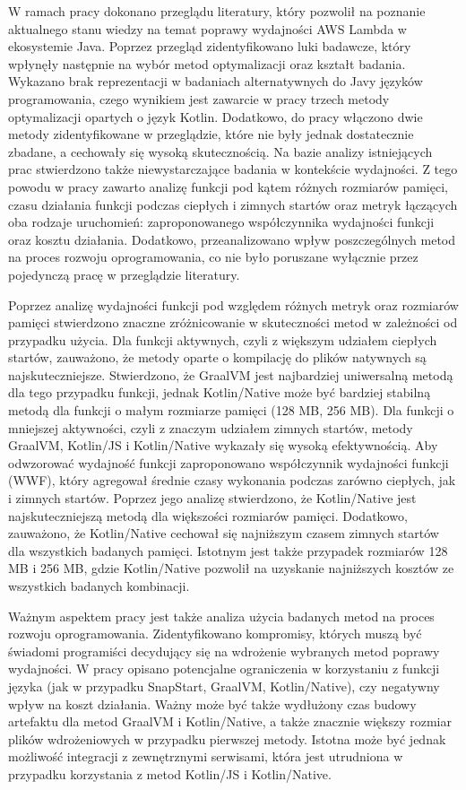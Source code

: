 W ramach pracy dokonano przeglądu literatury, który pozwolił na poznanie aktualnego stanu wiedzy na temat poprawy wydajności AWS Lambda w ekosystemie Java.
Poprzez przegląd zidentyfikowano luki badawcze, który wpłynęły następnie na wybór metod optymalizacji oraz kształt badania.
Wykazano brak reprezentacji w badaniach alternatywnych do Javy języków programowania, czego wynikiem jest zawarcie w pracy trzech metody optymalizacji opartych o język Kotlin.
Dodatkowo, do pracy włączono dwie metody zidentyfikowane w przeglądzie, które nie były jednak dostatecznie zbadane, a cechowały się wysoką skutecznością.
Na bazie analizy istniejących prac stwierdzono także niewystarczające badania w kontekście wydajności.
Z tego powodu w pracy zawarto analizę funkcji pod kątem różnych rozmiarów pamięci, czasu działania funkcji podczas ciepłych i zimnych startów oraz metryk łączących oba rodzaje uruchomień: zaproponowanego współczynnika wydajności funkcji oraz kosztu działania.
Dodatkowo, przeanalizowano wpływ poszczególnych metod na proces rozwoju oprogramowania, co nie było poruszane wyłącznie przez pojedynczą pracę w przeglądzie literatury.

Poprzez analizę wydajności funkcji pod względem różnych metryk oraz rozmiarów pamięci stwierdzono znaczne zróżnicowanie w skuteczności metod w zależności od przypadku użycia.
Dla funkcji aktywnych, czyli z większym udziałem ciepłych startów, zauważono, że metody oparte o kompilację do plików natywnych są najskuteczniejsze.
Stwierdzono, że GraalVM jest najbardziej uniwersalną metodą dla tego przypadku funkcji, jednak Kotlin/Native może być bardziej stabilną metodą dla funkcji o małym rozmiarze pamięci (128 MB, 256 MB).
Dla funkcji o mniejszej aktywności, czyli z znaczym udziałem zimnych startów, metody GraalVM, Kotlin/JS i Kotlin/Native wykazały się wysoką efektywnością.
Aby odwzorować wydajność funkcji zaproponowano współczynnik wydajności funkcji (WWF), który agregował średnie czasy wykonania podczas zarówno ciepłych, jak i zimnych startów.
Poprzez jego analizę stwierdzono, że Kotlin/Native jest najskuteczniejszą metodą dla większości rozmiarów pamięci.
Dodatkowo, zauważono, że Kotlin/Native cechował się najniższym czasem zimnych startów dla wszystkich badanych pamięci.
Istotnym jest także przypadek rozmiarów 128 MB i 256 MB, gdzie Kotlin/Native pozwolił na uzyskanie najniższych kosztów ze wszystkich badanych kombinacji.

Ważnym aspektem pracy jest także analiza użycia badanych metod na proces rozwoju oprogramowania.
Zidentyfikowano kompromisy, których muszą być świadomi programiści decydujący się na wdrożenie wybranych metod poprawy wydajności.
W pracy opisano potencjalne ograniczenia w korzystaniu z funkcji języka (jak w przypadku SnapStart, GraalVM, Kotlin/Native), czy negatywny wpływ na koszt działania.
Ważny może być także wydłużony czas budowy artefaktu dla metod GraalVM i Kotlin/Native, a także znacznie większy rozmiar plików wdrożeniowych w przypadku pierwszej metody.
Istotna może być jednak możliwość integracji z zewnętrznymi serwisami, która jest utrudniona w przypadku korzystania z metod Kotlin/JS i Kotlin/Native.

